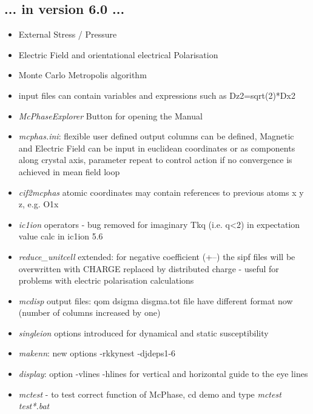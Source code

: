 \documentclass[twoside]{article}
\newcommand{\prg}{\sl}
\begin{document}
\subsection*{ ... in version 6.0 ...}
\begin{itemize}
\item    External Stress / Pressure
\item    Electric Field and orientational electrical Polarisation
\item    Monte Carlo Metropolis algorithm
\item    input files can contain variables and expressions such as Dz2=sqrt(2)*Dx2
\item    {\prg McPhaseExplorer} Button for opening the Manual  
\item    {\prg mcphas.ini}: flexible user defined output columns can be defined,
          Magnetic and Electric Field can be input in euclidean coordinates or as components along crystal axis,
          parameter repeat to control action if no convergence is achieved in mean field loop
\item    {\prg cif2mcphas} atomic coordinates may contain references to previous atoms x y z, e.g. O1x
\item    {\prg ic1ion} operators -  bug removed for imaginary Tkq (i.e. q<2) in expectation value calc in ic1ion 5.6 
\item    {\prg reduce\_unitcell} extended: for negative coefficient (+--) the sipf files will be overwritten
         with CHARGE replaced by distributed charge - useful for problems with electric polarisation calculations
\item    {\prg mcdisp} output files:  qom dsigma disgma.tot file have different format now (number of columns increased by one)
\item   {\prg singleion} options  introduced for dynamical and static susceptibility 
\item   {\prg makenn}: new options -rkkynest -djdeps1-6
\item    {\prg display}: option -vlines -hlines for vertical and horizontal guide to the eye lines
\item    {\prg mctest} - to test correct function of McPhase, cd  demo  and type {\prg mctest test*.bat }
\end{itemize}
\end{document}
